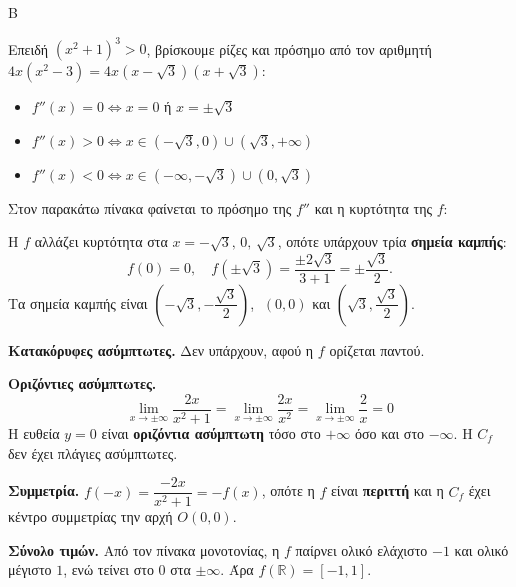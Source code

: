 \begin{thema}{Β}
\begin{erwthma}
Επειδή $(x^2+1)^3>0$, βρίσκουμε ρίζες και πρόσημο από τον αριθμητή $4x(x^2-3)=4x(x-\sqrt{3})(x+\sqrt{3})$:
\begin{itemize}
    \item $f''(x)=0\Leftrightarrow x=0$ ή $x=\pm\sqrt{3}$
    \item $f''(x)>0\Leftrightarrow x\in(-\sqrt{3},0)\cup(\sqrt{3},+\infty)$
    \item $f''(x)<0\Leftrightarrow x\in(-\infty,-\sqrt{3})\cup(0,\sqrt{3})$
\end{itemize}
Στον παρακάτω πίνακα φαίνεται το πρόσημο της $f''$ και η κυρτότητα της $f$:
\begin{center}
\end{center}
Η $f$ αλλάζει κυρτότητα στα $x=-\sqrt{3},\,0,\,\sqrt{3}$, οπότε υπάρχουν τρία \textbf{σημεία καμπής}:
\[
f(0)=0,\quad f(\pm\sqrt{3})=\frac{\pm2\sqrt{3}}{3+1}=\pm\frac{\sqrt{3}}{2}.
\]
Τα σημεία καμπής είναι $\left(-\sqrt{3},-\dfrac{\sqrt{3}}{2}\right)$, $\;(0,0)$ και $\left(\sqrt{3},\dfrac{\sqrt{3}}{2}\right)$.

\item \textbf{Κατακόρυφες ασύμπτωτες.} Δεν υπάρχουν, αφού η $f$ ορίζεται παντού.

\textbf{Οριζόντιες ασύμπτωτες.}
\[
\lim_{x\to\pm\infty}\frac{2x}{x^2+1}=\lim_{x\to\pm\infty}\frac{2x}{x^2}=\lim\limits_{x\to\pm\infty}{\dfrac{2}{x}}=0
\]
Η ευθεία $y=0$ είναι \textbf{οριζόντια ασύμπτωτη} τόσο στο $+\infty$ όσο και στο $-\infty$. Η $C_f$ δεν έχει πλάγιες ασύμπτωτες.

\textbf{Συμμετρία.} $f(-x)=\dfrac{-2x}{x^2+1}=-f(x)$, οπότε η $f$ είναι \textbf{περιττή} και η $C_f$ έχει κέντρο συμμετρίας την αρχή $O(0,0)$.

\textbf{Σύνολο τιμών.} Από τον πίνακα μονοτονίας, η $f$ παίρνει ολικό ελάχιστο $-1$ και ολικό μέγιστο $1$, ενώ τείνει στο $0$ στα $\pm\infty$. Άρα $f(\mathbb{R})=[-1,1]$.


\end{erwthma}
\end{thema}
